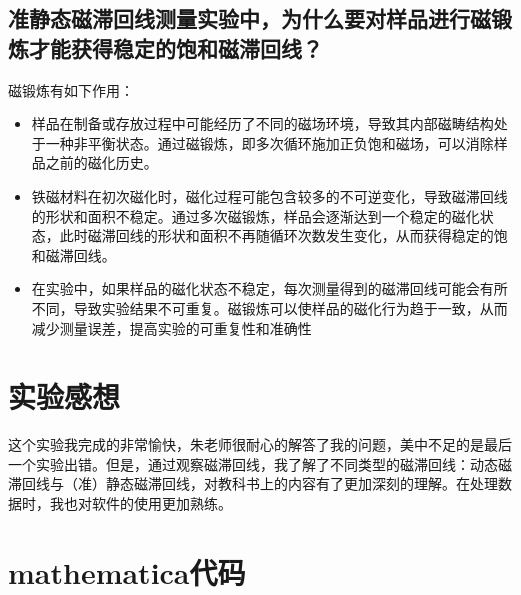 \documentclass[11pt]{article}
\begin{document}
	\subsection{准静态磁滞回线测量实验中，为什么要对样品进行磁锻炼才能获得稳定的饱和磁滞回线？}
	磁锻炼有如下作用：
	\begin{itemize}
		\item 样品在制备或存放过程中可能经历了不同的磁场环境，导致其内部磁畴结构处于一种非平衡状态。通过磁锻炼，即多次循环施加正负饱和磁场，可以消除样品之前的磁化历史。
		\item 铁磁材料在初次磁化时，磁化过程可能包含较多的不可逆变化，导致磁滞回线的形状和面积不稳定。通过多次磁锻炼，样品会逐渐达到一个稳定的磁化状态，此时磁滞回线的形状和面积不再随循环次数发生变化，从而获得稳定的饱和磁滞回线。
		\item 在实验中，如果样品的磁化状态不稳定，每次测量得到的磁滞回线可能会有所不同，导致实验结果不可重复。磁锻炼可以使样品的磁化行为趋于一致，从而减少测量误差，提高实验的可重复性和准确性
	\end{itemize}
	
	\section{实验感想}
	这个实验我完成的非常愉快，朱老师很耐心的解答了我的问题，美中不足的是最后一个实验出错。但是，通过观察磁滞回线，我了解了不同类型的磁滞回线：动态磁滞回线与（准）静态磁滞回线，对教科书上的内容有了更加深刻的理解。在处理数据时，我也对软件的使用更加熟练。
	
	\newpage
	
	\appendix
	\section{mathematica代码}
\end{document}
